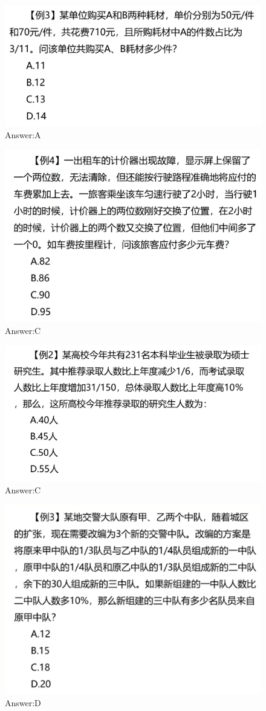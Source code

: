 \documentclass{article}
\numberwithin{equation}{section}						%
\numberwithin{figure}{section}							%
\begin{document}
\begin{sloppypar}
\begin{figure}[H]
     \centering
     \includegraphics[width=0.6\linewidth]{250.png}
		\caption{Answer:A}
\end{figure}

\begin{figure}[H]
     \centering
     \includegraphics[width=0.6\linewidth]{251.png}
		\caption{Answer:C}
\end{figure}

\begin{figure}[H]
     \centering
     \includegraphics[width=0.6\linewidth]{252.png}
		\caption{Answer:C}
\end{figure}

\begin{figure}[H]
     \centering
     \includegraphics[width=0.6\linewidth]{253.png}
		\caption{Answer:D}
\end{figure}



\end{sloppypar}
\end{document}
